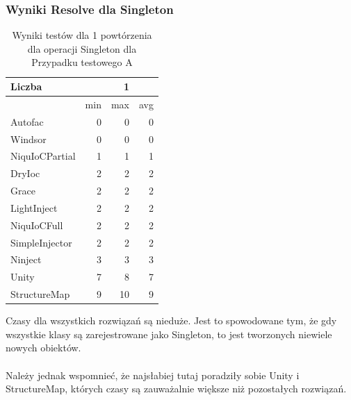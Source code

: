 \documentclass[12pt]{article}
\begin{document}
\subsubsection{Wyniki Resolve dla Singleton}
\begin{table}[H]
\captionsetup{belowskip=0pt,aboveskip=0pt}
\begin{center}
\begin{small}
	\begin{tabular}{ | l | r r r | }
    		\hline
Liczba & & 1 & \\ \hline
 & min & max & avg \\ \hline
Autofac & 0 & 0 & 0 \\ \hline
Windsor & 0 & 0 & 0 \\ \hline
NiquIoCPartial & 1 & 1 & 1 \\ \hline
DryIoc & 2 & 2 & 2 \\ \hline
Grace & 2 & 2 & 2 \\ \hline
LightInject & 2 & 2 & 2 \\ \hline
NiquIoCFull & 2 & 2 & 2 \\ \hline
SimpleInjector & 2 & 2 & 2 \\ \hline
Ninject & 3 & 3 & 3 \\ \hline
Unity & 7 & 8 & 7 \\ \hline
StructureMap & 9 & 10 & 9 \\ \hline
  	\end{tabular}
\end{small}
\end{center}
\caption{Wyniki testów dla 1 powtórzenia dla operacji Singleton dla Przypadku testowego A}
\label{TestCaseA_Singleton1}
\end{table}
Czasy dla wszystkich rozwiązań są nieduże. Jest to spowodowane tym, że gdy wszystkie klasy są zarejestrowane jako Singleton, to jest tworzonych niewiele nowych obiektów.\\
\\
Należy jednak wspomnieć, że najsłabiej tutaj  poradziły sobie Unity i StructureMap, których czasy są zauważalnie większe niż pozostałych rozwiązań.
\\ \\
\end{document}
